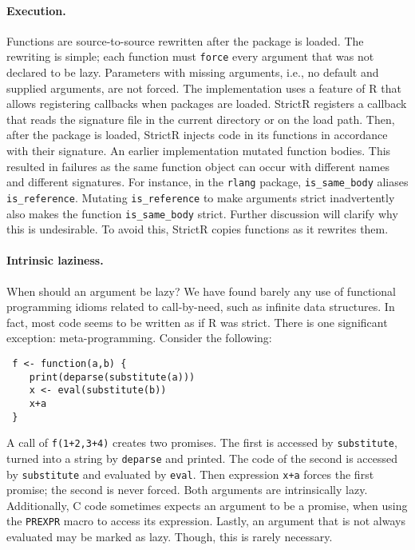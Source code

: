 \documentclass[review,screen,acmsmall]{acmart}
\renewcommand{\c}[1]{\lstinline |#1|\xspace}
\newcommand{\strictr}{{\sf StrictR}\xspace}
\begin{document}
\paragraph{Execution.}
Functions are source-to-source rewritten after the package is loaded. The
rewriting is simple; each function must \c{force} every argument that was not
declared to be lazy. Parameters with missing arguments, i.e., no default and
supplied arguments, are not forced. The implementation uses a feature of R that
allows registering callbacks when packages are loaded. \strictr registers a
callback that reads the signature file in the current directory or on the load
path. Then, after the package is loaded, \strictr injects code in its functions
in accordance with their signature. An earlier implementation mutated function
bodies. This resulted in failures as the same function object can occur with
different names and different signatures. For instance, in the \c{rlang}
package, \c{is_same_body} aliases \c{is_reference}. Mutating \c{is_reference} to
make arguments strict inadvertently also makes the function \c{is_same_body}
strict. Further discussion will clarify why this is undesirable. To avoid this,
\strictr copies functions as it rewrites them.
\newpage
\paragraph{Intrinsic laziness.} When should an  argument be lazy?
We have found barely any use of functional programming idioms related to
call-by-need, such as infinite data structures. In fact, most code seems to be
written as if R was strict. There is one significant exception:
meta-programming. Consider the following:
\begin{lstlisting}
 f <- function(a,b) {
    print(deparse(substitute(a)))
    x <- eval(substitute(b))
    x+a
 }
\end{lstlisting}

\medskip

A call of \c{f(1+2,3+4)} creates two promises. The first is accessed by
\c{substitute}, turned into a string by \c{deparse} and printed. The code of the
second is accessed by \c{substitute} and evaluated by \c{eval}. Then expression
\c{x+a} forces the first promise; the second is never forced. Both arguments are
intrinsically lazy.
Additionally, C code sometimes expects an
argument to be a promise, when using the \c{PREXPR} macro to access its
expression. Lastly, an argument that is not always evaluated may be marked as
lazy. Though, this is rarely necessary.
\end{document}
